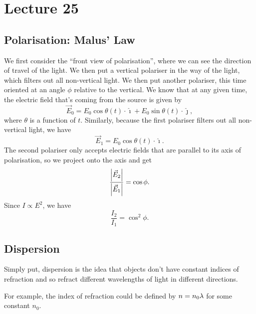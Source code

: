 \documentclass[class=article, crop=false]{standalone}
\begin{document}
  \section{Lecture 25}
  \subsection{Polarisation: Malus' Law}
  We first consider the ``front view of polarisation'', where we can see the direction of travel of the light. We then put a vertical polariser in the way of the light, which filters out all non-vertical light. We then put another polariser, this time oriented at an angle $\phi$ relative to the vertical. We know that at any given time, the electric field that's coming from the source is given by
  \[
    \vec{E}_0 = E_0\cos \theta(t)\cdot \hat{\imath} + E_0\sin \theta(t)\cdot \hat{\jmath},
  \]
  where $\theta$ is a function of $t$. Similarly, because the first polariser filters out all non-vertical light, we have
  \[
    \vec{E}_1 = E_0\cos\theta(t)\cdot \hat{\imath}.
  \]
  The second polariser only accepts electric fields that are parallel to its axis of polarisation, so we project onto the axis and get
  \[
    \frac{\left\lvert \vec{E}_2 \right\rvert}{\left\lvert \vec{E}_1 \right\rvert} = \cos\phi.
  \]
  Since $I\propto E^2$, we have
  \[
    \frac{I_2}{I_1} = \cos^2\phi.
  \]
  \subsection{Dispersion}
  \begin{note}{}
    Simply put, dispersion is the idea that objects don't have constant indices of refraction and so refract different wavelengths of light in different directions.
  \end{note}
  For example, the index of refraction could be defined by $n = n_0\lambda$ for some constant $n_0$.
\end{document}
